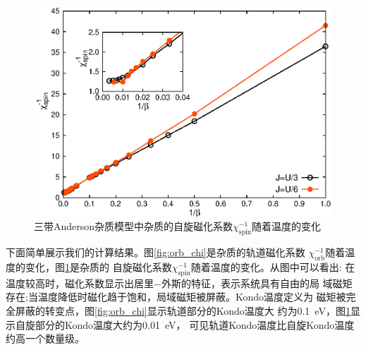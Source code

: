 \begin{figure}
\centering
\includegraphics{figure/spin_chi.eps}
\caption{三带Anderson杂质模型中杂质的自旋磁化系数$\chi^{-1}_{\text{spin}}$随着温度的变化} 
\label{fig:spin_chi}
\end{figure}

下面简单展示我们的计算结果。图\ref{fig:orb_chi}是杂质的轨道磁化系数
$\chi^{-1}_{\text{orb}}$随着温度的变化，图\ref{fig:spin_chi}是杂质的
自旋磁化系数$\chi^{-1}_{\text{spin}}$随着温度的变化。从图中可以看出:
在温度较高时，磁化系数显示出居里$-$外斯的特征，表示系统具有自由的局
域磁矩存在;当温度降低时磁化趋于饱和，局域磁矩被屏蔽。Kondo温度定义为
磁矩被完全屏蔽的转变点，图\ref{fig:orb_chi}显示轨道部分的Kondo温度大
约为0.1\ eV，图\ref{fig:spin_chi}显示自旋部分的Kondo温度大约为0.01\ eV，
可见轨道Kondo温度比自旋Kondo温度约高一个数量级。
